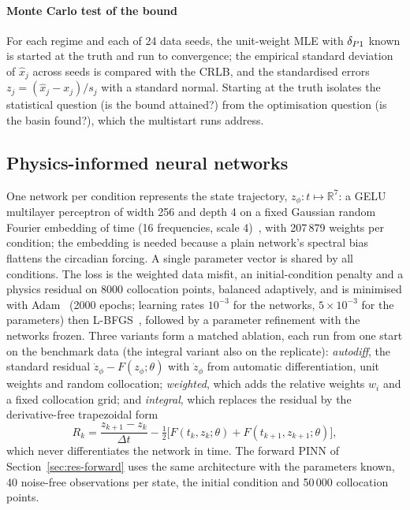 \paragraph{Monte Carlo test of the bound} For each regime and each of 24 data
seeds, the unit-weight MLE with $\delta_{P1}$ known is started at the truth and run to
convergence; the empirical standard deviation of $\hat x_j$ across seeds is
compared with the CRLB, and the standardised errors $z_j = (\hat x_j-x_j)/s_j$ with a
standard normal. Starting at the truth isolates the statistical question (is the
bound attained?) from the optimisation question (is the basin found?), which the
multistart runs address.

\subsection{Physics-informed neural networks}
\label{sec:m-pinn}

One network per condition represents the state trajectory, $z_\phi:t\mapsto
\mathbb{R}^7$: a GELU multilayer perceptron of width 256 and depth 4 on a fixed
Gaussian random Fourier embedding of time (16 frequencies, scale
4)~\citep{tancik2020fourier,wang2021eigenvector}, with 207\,879 weights per
condition; the embedding is needed because a plain network's spectral
bias~\citep{rahaman2019spectral} flattens the circadian forcing. A single
parameter vector is shared by all conditions. The loss is the weighted data
misfit, an initial-condition penalty and a physics residual on 8000 collocation
points, balanced adaptively, and is minimised with
Adam~\citep{kingma2015adam} (2000 epochs; learning rates $10^{-3}$ for the
networks, $5\times10^{-3}$ for the parameters) then
L-BFGS~\citep{liu1989lbfgs}, followed by a parameter refinement with the networks
frozen. Three variants form a matched ablation, each run from one start on the
benchmark data (the integral variant also on the replicate): \emph{autodiff}, the standard residual $\dot z_\phi - F(z_\phi;\theta)$
with $\dot z_\phi$ from automatic differentiation, unit weights and random
collocation; \emph{weighted}, which adds the relative weights $w_i$ and a fixed
collocation grid; and \emph{integral}, which replaces the residual by the
derivative-free trapezoidal form
\begin{equation}
R_k = \frac{z_{k+1}-z_k}{\Delta t} - \tfrac12\big[F(t_k,z_k;\theta) + F(t_{k+1},z_{k+1};\theta)\big],
\label{eq:integral}
\end{equation}
which never differentiates the network in time. The forward PINN of
Section~\ref{sec:res-forward} uses the same architecture with the parameters
known, 40 noise-free observations per state, the initial condition and 50\,000
collocation points.

